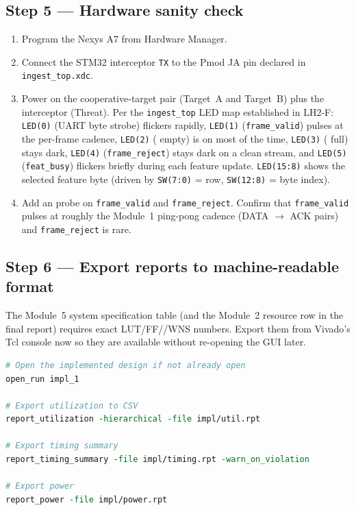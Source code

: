 \documentclass[11pt,letterpaper]{article}
\begin{document}
\subsection{Step 5 --- Hardware sanity check}
\begin{enumerate}[leftmargin=2em]
	\item Program the Nexys A7 from Hardware Manager.
	\item Connect the STM32 interceptor \UART{} \texttt{TX} to the Pmod JA pin declared in \texttt{ingest\_top.xdc}.
	\item Power on the cooperative-target pair (Target~A and Target~B) plus the interceptor (Threat). Per the \texttt{ingest\_top} LED map established in LH2-F: \texttt{LED(0)} (UART byte strobe) flickers rapidly, \texttt{LED(1)} (\texttt{frame\_valid}) pulses at the per-frame cadence, \texttt{LED(2)} (\FIFO{} empty) is on most of the time, \texttt{LED(3)} (\FIFO{} full) stays dark, \texttt{LED(4)} (\texttt{frame\_reject}) stays dark on a clean stream, and \texttt{LED(5)} (\texttt{feat\_busy}) flickers briefly during each feature update. \texttt{LED(15:8)} shows the selected feature byte (driven by \texttt{SW(7:0)} = row, \texttt{SW(12:8)} = byte index).
	\item Add an \ILA{} probe on \texttt{frame\_valid} and \texttt{frame\_reject}. Confirm that \texttt{frame\_valid} pulses at roughly the Module~1 ping-pong cadence (DATA $\to$ ACK pairs) and \texttt{frame\_reject} is rare.
\end{enumerate}


\subsection{Step 6 --- Export reports to machine-readable format}
The Module~5 system specification table (and the Module~2 resource row in the final report) requires exact \mbox{LUT}/\mbox{FF}/\BRAM{}/WNS numbers. Export them from Vivado's Tcl console now so they are available without re-opening the GUI later.

\begin{lstlisting}[language=Tcl, caption={Run in the Vivado Tcl Console after implementation completes.}]
# Open the implemented design if not already open
open_run impl_1

# Export utilization to CSV
report_utilization -hierarchical -file impl/util.rpt

# Export timing summary
report_timing_summary -file impl/timing.rpt -warn_on_violation

# Export power
report_power -file impl/power.rpt
\end{lstlisting}
\end{document}
